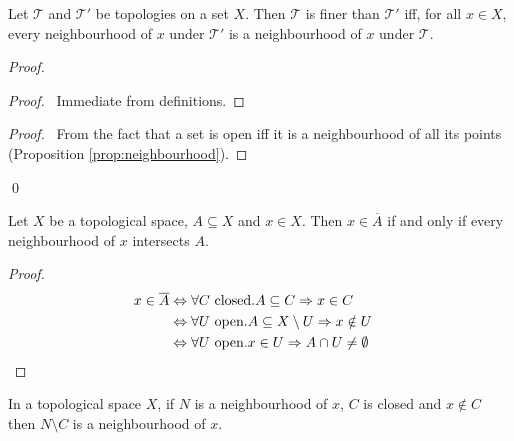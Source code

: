 \begin{prop}
  Let $\mathcal{T}$ and $\mathcal{T}'$ be topologies on a set $X$. Then $\mathcal{T}$ is finer than $\mathcal{T}'$ iff, for all $x \in X$, every neighbourhood of $x$ under $\mathcal{T}'$ is a neighbourhood of $x$ under $\mathcal{T}$.
\end{prop}

\begin{proof}
  \pf
  \begin{proof}
    \pf\ Immediate from definitions.
  \end{proof}
  \begin{proof}
    \pf\ From the fact that a set is open iff it is a neighbourhood of all its points (Proposition \ref{prop:neighbourhood}).
  \end{proof}
  \qed
\end{proof}

\begin{prop}
  \label{prop:closure:membership}
  Let $X$ be a topological space, $A \subseteq X$ and $x \in X$. Then $x \in \overline{A}$ if and only if every neighbourhood of $x$ intersects $A$.
\end{prop}

\begin{proof}
  \pf
  \begin{align*}
    x \in \overline{A} & \Leftrightarrow \forall C \text{ closed} . A \subseteq C \Rightarrow x \in C \\
    & \Leftrightarrow \forall U \text{ open} . A \subseteq X \setminus U \Rightarrow x \notin U \\
    & \Leftrightarrow \forall U \text{ open} . x \in U \Rightarrow A \cap U \neq \emptyset & \qed
  \end{align*}
\end{proof}

\begin{prop}
  \label{prop:neighbourhood:minus_closed}
  In a topological space $X$,
  if $N$ is a neighbourhood of $x$, $C$ is closed and $x \notin C$ then $N \setminus C$ is a neighbourhood of $x$.
\end{prop}

